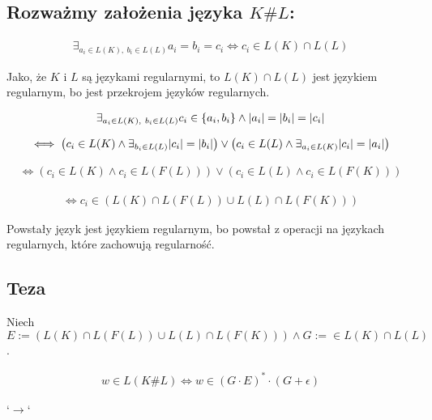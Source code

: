 \documentclass{article}
\theoremstyle{definition}
\theoremstyle{remark}
\begin{document}
\subsection{Rozważmy założenia języka \(K \# L\):}

\begin{align*}
    \exists_{ a_i \in L(K), \ b_i \in L(L)} { a_i = b_i = c_i }\iff c_i \in L(K) \cap L(L)
\end{align*}

Jako, że \(K\) i \(L\) są językami regularnymi, to \(L(K) \cap L(L)\) jest językiem regularnym, bo jest przekrojem języków regularnych.


\begin{align*}
\exists_{ a_i \in L(K), \ b_i \in L(L)} { c_i \in \left\{ a_i, b_i \right\} \land \abs{a_i}=\abs{b_i}=\abs{c_i} }
\end{align*}

\begin{align*}
\iff
\left( c_i \in L(K) \land \exists_{ b_i \in L(L) }{ \abs{c_i} = \abs{b_i} } \right) \lor \left( c_i \in L(L) \land \exists_{ a_i \in L(K) }{ \abs{c_i} = \abs{a_i} } \right)
\end{align*}

\begin{align*}
    \iff
    \left( c_i \in L(K) \land c_i \in L(F(L)) \right) \lor \left( c_i \in L(L) \land c_i \in L(F(K)) \right)
\end{align*}

\begin{align*}
    \iff
    c_i \in \left( L(K) \cap L(F(L)) \cup L(L) \cap L(F(K)) \right)
\end{align*}

Powstały język jest językiem regularnym, bo powstał z operacji na językach regularnych, które zachowują regularność.

\subsection{Teza}

Niech \( E := \left( L(K) \cap L(F(L)) \cup L(L) \cap L(F(K)) \right) \land G := \in L(K) \cap L(L) \).

\begin{align*}
    w \in L(K \# L) \iff w \in \left( G \cdot E \right)^* \cdot \left( G + \epsilon \right)
\end{align*}

`\( \rightarrow \)` \\
\end{document}
